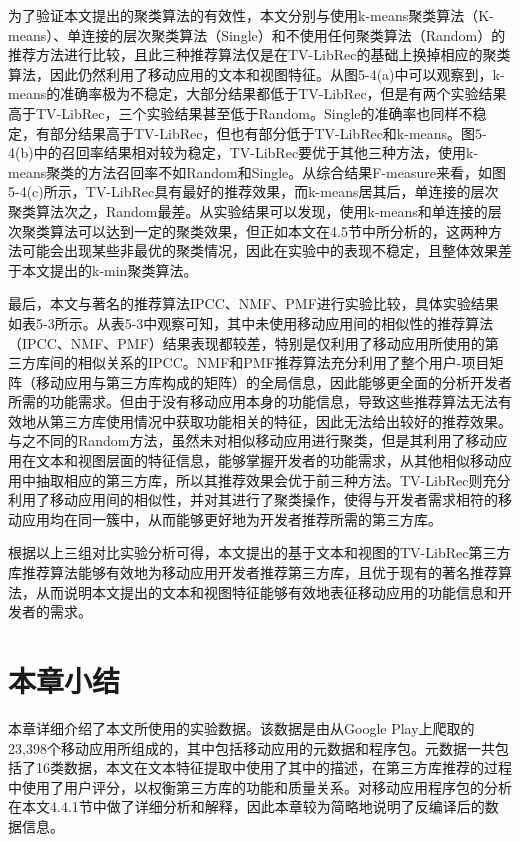 为了验证本文提出的聚类算法的有效性，本文分别与使用k-means聚类算法（K-means）、单连接的层次聚类算法（Single）和不使用任何聚类算法（Random）的推荐方法进行比较，且此三种推荐算法仅是在TV-LibRec的基础上换掉相应的聚类算法，因此仍然利用了移动应用的文本和视图特征。从图5-4(a)中可以观察到，k-means的准确率极为不稳定，大部分结果都低于TV-LibRec，但是有两个实验结果高于TV-LibRec，三个实验结果甚至低于Random。Single的准确率也同样不稳定，有部分结果高于TV-LibRec，但也有部分低于TV-LibRec和k-means。图5-4(b)中的召回率结果相对较为稳定，TV-LibRec要优于其他三种方法，使用k-means聚类的方法召回率不如Random和Single。从综合结果F-measure来看，如图5-4(c)所示，TV-LibRec具有最好的推荐效果，而k-means居其后，单连接的层次聚类算法次之，Random最差。从实验结果可以发现，使用k-means和单连接的层次聚类算法可以达到一定的聚类效果，但正如本文在4.5节中所分析的，这两种方法可能会出现某些非最优的聚类情况，因此在实验中的表现不稳定，且整体效果差于本文提出的k-min聚类算法。

最后，本文与著名的推荐算法IPCC、NMF、PMF进行实验比较，具体实验结果如表5-3所示。从表5-3中观察可知，其中未使用移动应用间的相似性的推荐算法（IPCC、NMF、PMF）结果表现都较差，特别是仅利用了移动应用所使用的第三方库间的相似关系的IPCC。NMF和PMF推荐算法充分利用了整个用户-项目矩阵（移动应用与第三方库构成的矩阵）的全局信息，因此能够更全面的分析开发者所需的功能需求。但由于没有移动应用本身的功能信息，导致这些推荐算法无法有效地从第三方库使用情况中获取功能相关的特征，因此无法给出较好的推荐效果。与之不同的Random方法，虽然未对相似移动应用进行聚类，但是其利用了移动应用在文本和视图层面的特征信息，能够掌握开发者的功能需求，从其他相似移动应用中抽取相应的第三方库，所以其推荐效果会优于前三种方法。TV-LibRec则充分利用了移动应用间的相似性，并对其进行了聚类操作，使得与开发者需求相符的移动应用均在同一簇中，从而能够更好地为开发者推荐所需的第三方库。

根据以上三组对比实验分析可得，本文提出的基于文本和视图的TV-LibRec第三方库推荐算法能够有效地为移动应用开发者推荐第三方库，且优于现有的著名推荐算法，从而说明本文提出的文本和视图特征能够有效地表征移动应用的功能信息和开发者的需求。



\section{本章小结}
本章详细介绍了本文所使用的实验数据。该数据是由从Google Play上爬取的23,398个移动应用所组成的，其中包括移动应用的元数据和程序包。元数据一共包括了16类数据，本文在文本特征提取中使用了其中的描述，在第三方库推荐的过程中使用了用户评分，以权衡第三方库的功能和质量关系。对移动应用程序包的分析在本文4.4.1节中做了详细分析和解释，因此本章较为简略地说明了反编译后的数据信息。


